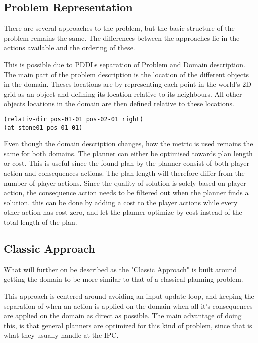 	\subsection{Problem Representation}
		There are several approaches to the problem, but the basic structure of the problem remains the same. The differences between the approaches lie in the actions available and the ordering of these. 


		This is possible due to PDDLs separation of Problem and Domain description. The main part of the problem description is the location of the different objects in the domain. Theses locations are by representing each point in the world's 2D grid as an object and defining its location relative to its neighbours. All other objects locations in the domain are then defined relative to these locations.
		\begin{lstlisting}
(relativ-dir pos-01-01 pos-02-01 right)
(at stone01 pos-01-01)
		\end{lstlisting}
		

		
		Even though the domain description changes, how the metric is used remains the same for both domains. The planner can either be optimised towards plan length or cost. This is useful since the found plan by the planner consist of both player action and consequences actions. The plan length will therefore differ from the number of player actions. Since the quality of solution is solely based on player action, the consequence action needs to be filtered out when the planner finds a solution. this can be done by adding a cost to the player actions while every other action has cost zero, and let the planner optimize by cost instead of the total length of the plan.		

		
		\subsection{Classic Approach}
		What will further on be described as the "Classic Approach" is built around getting the domain to be more similar to that of a classical planning problem. 

		This approach is centered around avoiding an input update loop, and keeping the separation of when an action is applied on the domain when all it's consequences are applied on the domain as direct as possible. The main advantage of doing this, is that general planners are optimized for this kind of problem, since that is what they usually handle at the IPC.
		
